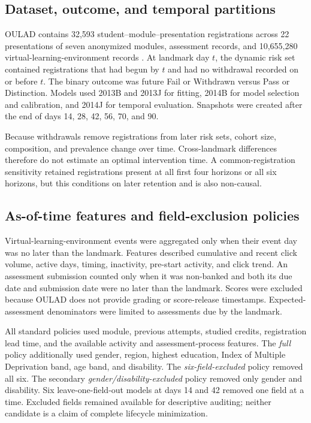 \documentclass[11pt]{article}
\begin{document}
\subsection{Dataset, outcome, and temporal partitions}

OULAD contains 32,593 student--module--presentation registrations across 22 presentations of seven anonymized modules, assessment records, and 10,655,280 virtual-learning-environment records \citep{kuzilek2017oulad}. At landmark day $t$, the dynamic risk set contained registrations that had begun by $t$ and had no withdrawal recorded on or before $t$. The binary outcome was future Fail or Withdrawn versus Pass or Distinction. Models used 2013B and 2013J for fitting, 2014B for model selection and calibration, and 2014J for temporal evaluation. Snapshots were created after the end of days 14, 28, 42, 56, 70, and 90.

Because withdrawals remove registrations from later risk sets, cohort size, composition, and prevalence change over time. Cross-landmark differences therefore do not estimate an optimal intervention time. A common-registration sensitivity retained registrations present at all first four horizons or all six horizons, but this conditions on later retention and is also non-causal.

\subsection{As-of-time features and field-exclusion policies}

Virtual-learning-environment events were aggregated only when their event day was no later than the landmark. Features described cumulative and recent click volume, active days, timing, inactivity, pre-start activity, and click trend. An assessment submission counted only when it was non-banked and both its due date and submission date were no later than the landmark. Scores were excluded because OULAD does not provide grading or score-release timestamps. Expected-assessment denominators were limited to assessments due by the landmark.

All standard policies used module, previous attempts, studied credits, registration lead time, and the available activity and assessment-process features. The \emph{full} policy additionally used gender, region, highest education, Index of Multiple Deprivation band, age band, and disability. The \emph{six-field-excluded} policy removed all six. The secondary \emph{gender/disability-excluded} policy removed only gender and disability. Six leave-one-field-out models at days 14 and 42 removed one field at a time. Excluded fields remained available for descriptive auditing; neither candidate is a claim of complete lifecycle minimization.
\end{document}
